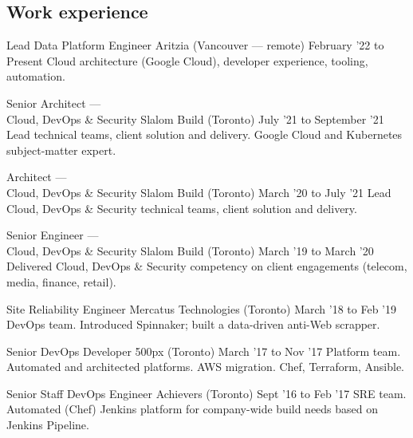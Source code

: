 \documentclass[]{cvpn}
\begin{document}
\cvheader{}

     {\def\gitrev{\unskip}}
     {\def\gitrev{unknown}}
\cvtag{\gitrev}

\begin{multicols}{2}
\section{Work experience}
\begin{eventlist}

\item{Lead Data Platform Engineer}
     {Aritzia (Vancouver --- remote)}
     {February '22 to Present}
{
     Cloud architecture (Google Cloud), developer experience, tooling, automation.
}

\item{Senior Architect ---\\Cloud, DevOps \& Security}
     {Slalom Build (Toronto)}
     {July '21 to September '21}
{
     Lead  technical teams, client solution and delivery.
     Google Cloud and Kubernetes subject-matter expert.
}
\eventlink{}

\item{Architect ---\\Cloud, DevOps \& Security}
     {Slalom Build (Toronto)}
     {March '20 to July '21}
{
Lead Cloud, DevOps \& Security
technical teams, client solution and delivery.
}

\eventlink{}

\item{Senior Engineer ---\\Cloud, DevOps \& Security}
     {Slalom Build (Toronto)}
     {March '19 to March '20}
{
Delivered Cloud, DevOps \& Security competency
on client engagements (telecom, media, finance, retail).
}

\item{Site Reliability Engineer}
     {Mercatus Technologies (Toronto)}
     {March '18 to Feb '19}
{
DevOps team.
Introduced Spinnaker; built a data-driven anti-Web scrapper.
}

\item{Senior DevOps Developer}
     {500px (Toronto)}
     {March '17 to Nov '17}
{
Platform team.
Automated and architected platforms.
AWS migration. Chef, Terraform, Ansible.
}

\item{Senior Staff DevOps Engineer}
     {Achievers (Toronto)}
     {Sept '16 to Feb '17}
{
SRE team.
Automated (Chef) Jenkins platform for company-wide build
needs based on Jenkins Pipeline.
}


\end{eventlist}
\end{multicols}
\end{document}

